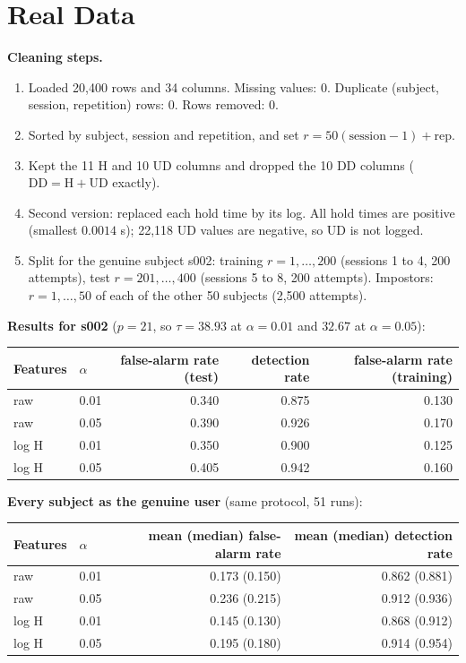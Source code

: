 \documentclass[11pt]{article}
\theoremstyle{plain}
\begin{document}
\section{Real Data}\label{sec:real}

\textbf{Cleaning steps.}
\begin{enumerate}[nosep]
\item Loaded 20,400 rows and 34 columns. Missing values: 0. Duplicate
  (subject, session, repetition) rows: 0. Rows removed: 0.
\item Sorted by subject, session and repetition, and set $r=50(\text{session}-1)+\text{rep}$.
\item Kept the 11 H and 10 UD columns and dropped the 10 DD columns
  ($\text{DD}=\text{H}+\text{UD}$ exactly).
\item Second version: replaced each hold time by its log. All hold times are positive
  (smallest $0.0014$ s); 22,118 UD values are negative, so UD is not logged.
\item Split for the genuine subject s002: training $r=1,\dots,200$ (sessions 1 to 4,
  200 attempts), test $r=201,\dots,400$ (sessions 5 to 8, 200 attempts). Impostors:
  $r=1,\dots,50$ of each of the other 50 subjects (2,500 attempts).
\end{enumerate}

\textbf{Results for s002} ($p=21$, so $\tau=38.93$ at $\alpha=0.01$ and $32.67$ at $\alpha=0.05$):

\begin{table}[H]
\centering\small
\begin{tabular}{@{}llrrr@{}}
\toprule
Features & $\alpha$ & false-alarm rate (test) & detection rate & false-alarm rate (training)\\
\midrule
raw & 0.01 & 0.340 & 0.875 & 0.130\\
raw & 0.05 & 0.390 & 0.926 & 0.170\\
log H & 0.01 & 0.350 & 0.900 & 0.125\\
log H & 0.05 & 0.405 & 0.942 & 0.160\\
\bottomrule
\end{tabular}
\end{table}

\textbf{Every subject as the genuine user} (same protocol, 51 runs):

\begin{table}[H]
\centering\small
\begin{tabular}{@{}llrr@{}}
\toprule
Features & $\alpha$ & mean (median) false-alarm rate & mean (median) detection rate\\
\midrule
raw & 0.01 & 0.173 (0.150) & 0.862 (0.881)\\
raw & 0.05 & 0.236 (0.215) & 0.912 (0.936)\\
log H & 0.01 & 0.145 (0.130) & 0.868 (0.912)\\
log H & 0.05 & 0.195 (0.180) & 0.914 (0.954)\\
\bottomrule
\end{tabular}
\end{table}
\end{document}
